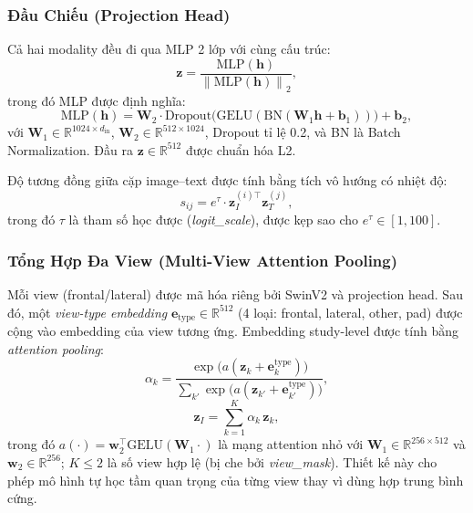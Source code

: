 \documentclass[12pt, a4paper]{article}
\newcommand{\vect}[1]{\mathbf{#1}}
\newcommand{\norm}[1]{\left\lVert#1\right\rVert}
\begin{document}
\subsubsection{Đầu Chiếu (Projection Head)}

Cả hai modality đều đi qua MLP 2 lớp với cùng cấu trúc:
\begin{equation}
  \vect{z} = \frac{\text{MLP}(\vect{h})}{\norm{\text{MLP}(\vect{h})}_2},
  \label{eq:proj}
\end{equation}
trong đó MLP được định nghĩa:
\begin{equation}
  \text{MLP}(\vect{h}) = \vect{W}_2 \cdot \text{Dropout}\bigl(
    \text{GELU}(\text{BN}(\vect{W}_1 \vect{h} + \vect{b}_1))
  \bigr) + \vect{b}_2,
\end{equation}
với $\vect{W}_1 \in \mathbb{R}^{1024 \times d_\text{in}}$,
$\vect{W}_2 \in \mathbb{R}^{512 \times 1024}$,
Dropout tỉ lệ 0.2, và BN là Batch Normalization.
Đầu ra $\vect{z} \in \mathbb{R}^{512}$ được chuẩn hóa L2.

Độ tương đồng giữa cặp image--text được tính bằng tích vô hướng có nhiệt độ:
\begin{equation}
  s_{ij} = e^{\tau} \cdot \vect{z}_I^{(i)\top} \vect{z}_T^{(j)},
  \label{eq:sim}
\end{equation}
trong đó $\tau$ là tham số học được (\textit{logit\_scale}), được kẹp sao cho
$e^{\tau} \in [1, 100]$.

\subsubsection{Tổng Hợp Đa View (Multi-View Attention Pooling)}

Mỗi view (frontal/lateral) được mã hóa riêng bởi SwinV2 và projection head.
Sau đó, một \textit{view-type embedding} $\vect{e}_\text{type} \in \mathbb{R}^{512}$
(4 loại: frontal, lateral, other, pad) được cộng vào embedding của view tương ứng.
Embedding study-level được tính bằng \textit{attention pooling}:
\begin{equation}
  \alpha_k = \frac{\exp\bigl(a(\vect{z}_k + \vect{e}_k^\text{type})\bigr)}
                  {\sum_{k'} \exp\bigl(a(\vect{z}_{k'} + \vect{e}_{k'}^\text{type})\bigr)},
  \label{eq:attn_weight}
\end{equation}
\begin{equation}
  \vect{z}_I = \sum_{k=1}^{K} \alpha_k \, \vect{z}_k,
  \label{eq:study_emb}
\end{equation}
trong đó $a(\cdot) = \vect{w}_2^\top \text{GELU}(\vect{W}_1 \cdot)$ là mạng
attention nhỏ với $\vect{W}_1 \in \mathbb{R}^{256 \times 512}$ và
$\vect{w}_2 \in \mathbb{R}^{256}$; $K \leq 2$ là số view hợp lệ
(bị che bởi \textit{view\_mask}). Thiết kế này cho phép mô hình tự học
tầm quan trọng của từng view thay vì dùng hợp trung bình cứng.
\end{document}

